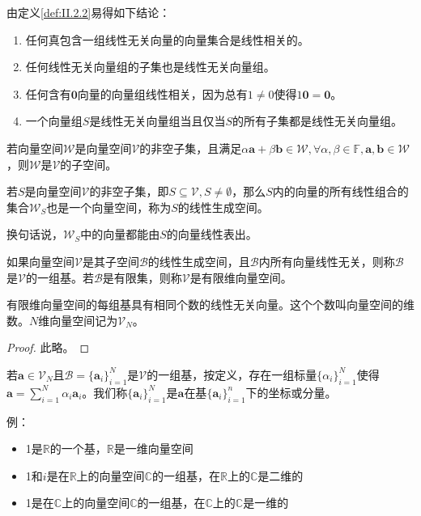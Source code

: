 \documentclass[main.tex]{subfiles}
\begin{document}
由定义\ref{def:II.2.2}易得如下结论：
\begin{enumerate}
    \item 任何真包含一组线性无关向量的向量集合是线性相关的\cite[定理3.1、3.2, p.~98]{周胜林2012线性代数}。
    \item 任何线性无关向量组的子集也是线性无关向量组。
    \item 任何含有$\mathbf{0}$向量的向量组线性相关，因为总有$1\neq 0$使得$1\mathbf{0}=\mathbf{0}$。
    \item 一个向量组$S$是线性无关向量组当且仅当$S$的所有子集都是线性无关向量组。
\end{enumerate}

\begin{definition}[子空间]
若向量空间$\mathcal{W}$是向量空间$\mathcal{V}$的非空子集，且满足$\alpha\mathbf{a}+\beta\mathbf{b}\in\mathcal{W},\forall\alpha,\beta\in\mathbb{F},\mathbf{a},\mathbf{b}\in\mathcal{W}$，则$\mathcal{W}$是$\mathcal{V}$的子空间。
\end{definition}

\begin{definition}[线性生成空间]
若$S$是向量空间$\mathcal{V}$的非空子集，即$S\subseteq\mathcal{V},S\neq\emptyset$，那么$S$内的向量的所有线性组合的集合$\mathcal{W}_S$也是一个向量空间，称为$S$的线性生成空间。
\end{definition}

换句话说，$\mathcal{W}_S$中的向量都能由$S$的向量线性表出。

\begin{definition}[基]
如果向量空间$\mathcal{V}$是其子空间$\mathcal{B}$的线性生成空间，且$\mathcal{B}$内所有向量线性无关，则称$\mathcal{B}$是$\mathcal{V}$的一组基。若$\mathcal{B}$是有限集，则称$\mathcal{V}$是有限维向量空间。
\end{definition}

\begin{theorem}
有限维向量空间的每组基具有相同个数的线性无关向量。这个个数叫向量空间的维数。$N$维向量空间记为$\mathcal{V}_N$。
\end{theorem}
\begin{proof}
此略\cite[“(3)的证明”，p.~171]{周胜林2012线性代数}。
\end{proof}

\begin{definition}[向量在给定基下的坐标]\label{def:II.2.6}
若$\mathbf{a}\in\mathcal{V}_N$且$\mathcal{B}=\{\mathbf{a}_i\}_{i=1}^N$是$\mathcal{V}$的一组基，按定义，存在一组标量$\{\alpha_i\}_{i=1}^N$使得$\mathbf{a}=\sum_{i=1}^N\alpha_i\mathbf{a}_i$。我们称$\{\mathbf{a}_i\}_{i=1}^N$是$\mathbf{a}$在基$\{\mathbf{a}_i\}_{i=1}^n$下的坐标或分量。
\end{definition}

例：
\begin{itemize}
    \item 1是$\mathbb{R}$的一个基，$\mathbb{R}$是一维向量空间
    \item 1和$i$是在$\mathbb{R}$上的向量空间$\mathbb{C}$的一组基，在$\mathbb{R}$上的$\mathbb{C}$是二维的
    \item 1是在$\mathbb{C}$上的向量空间$\mathbb{C}$的一组基，在$\mathbb{C}$上的$\mathbb{C}$是一维的
\end{itemize}
\end{document}

